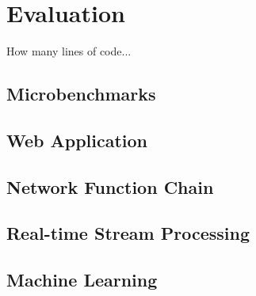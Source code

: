 \section{Evaluation}
\label{sec:evaluation}


How many lines of code...


\subsection{Microbenchmarks}

\subsection{Web Application}

\subsection{Network Function Chain}

\subsection{Real-time Stream Processing}

\subsection{Machine Learning}
